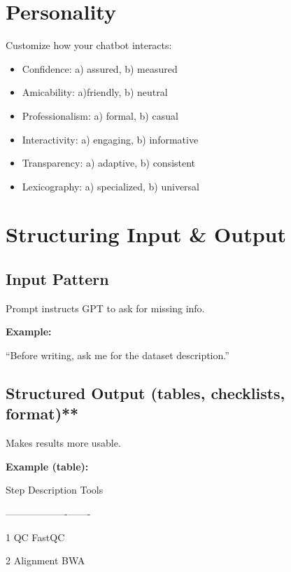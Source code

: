 \documentclass[
  letterpaper,
  DIV=11,
  numbers=noendperiod]{scrreprt}
\providecommand{\tightlist}{%
  \setlength{\itemsep}{0pt}\setlength{\parskip}{0pt}}
\begin{document}
\section{Personality}\label{personality}

Customize how your chatbot interacts:

\begin{itemize}
\tightlist
\item
  Confidence: a) assured, b) measured
\item
  Amicability: a)friendly, b) neutral
\item
  Professionalism: a) formal, b) casual
\item
  Interactivity: a) engaging, b) informative
\item
  Transparency: a) adaptive, b) consistent
\item
  Lexicography: a) specialized, b) universal
\end{itemize}

\section{Structuring Input \& Output}\label{structuring-input-output}

\subsection{Input Pattern}\label{input-pattern}

Prompt instructs GPT to ask for missing info.

\textbf{Example:}

``Before writing, ask me for the dataset description.''

\subsection{Structured Output (tables, checklists,
format)**}\label{structured-output-tables-checklists-format}

Makes results more usable.

\textbf{Example (table):}

\textbar{} Step \textbar{} Description \textbar{} Tools \textbar{}

\textbar------\textbar-------------\textbar-------\textbar{}

\textbar{} 1 \textbar{} QC \textbar{} FastQC \textbar{}

\textbar{} 2 \textbar{} Alignment \textbar{} BWA \textbar{}
\end{document}
